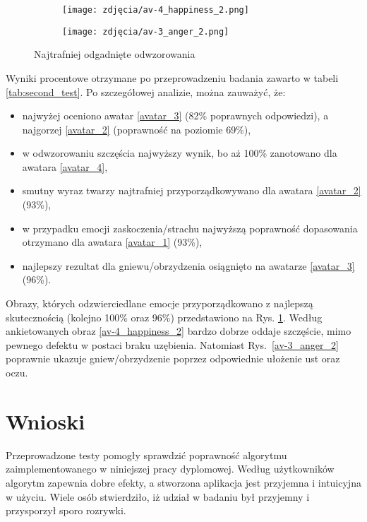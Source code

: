 \begin{figure}[h]
	\centering
	\begin{subfigure}{0.35\textwidth}
		\centering
		\texttt{[image: zdjęcia/av-4\_happiness\_2.png]}
		\subcaption{\label{av-4_happiness_2}}
	\end{subfigure}
	\begin{subfigure}{0.35\textwidth}
		\centering
		\texttt{[image: zdjęcia/av-3\_anger\_2.png]}
		\subcaption{\label{av-3_anger_2}}
	\end{subfigure}

	
	\caption{\label{fig:best_results}Najtrafniej odgadnięte odwzorowania}
\end{figure}

Wyniki procentowe otrzymane po przeprowadzeniu badania zawarto w tabeli \ref{tab:second_test}. Po szczegółowej analizie, można zauważyć, że:
\begin{itemize}
    \item najwyżej oceniono awatar \ref{avatar_3} (82\% poprawnych odpowiedzi), a najgorzej \ref{avatar_2} (poprawność na poziomie 69\%),
    \item w odwzorowaniu szczęścia najwyższy wynik, bo aż 100\% zanotowano dla awatara \ref{avatar_4},
    \item smutny wyraz twarzy najtrafniej przyporządkowywano dla awatara \ref{avatar_2} (93\%),
    \item w przypadku emocji zaskoczenia/strachu najwyższą poprawność dopasowania otrzymano dla awatara \ref{avatar_1} (93\%),
    \item najlepszy rezultat dla gniewu/obrzydzenia osiągnięto na awatarze \ref{avatar_3} (96\%).
\end{itemize}

Obrazy, których odzwierciedlane emocje przyporządkowano z najlepszą skutecznością (kolejno 100\% oraz 96\%) przedstawiono na Rys. \ref{fig:best_results}. Według ankietowanych obraz \ref{av-4_happiness_2} bardzo dobrze oddaje szczęście, mimo pewnego defektu w postaci braku uzębienia. Natomiast Rys.~\ref{av-3_anger_2} poprawnie ukazuje gniew/obrzydzenie poprzez odpowiednie ułożenie ust oraz oczu. 


\section{Wnioski}
Przeprowadzone testy pomogły sprawdzić poprawność algorytmu zaimplementowanego w niniejszej pracy dyplomowej. Według użytkowników algorytm zapewnia dobre efekty, a stworzona aplikacja jest przyjemna i intuicyjna w użyciu. Wiele osób stwierdziło, iż udział w badaniu był przyjemny i przysporzył sporo rozrywki.

